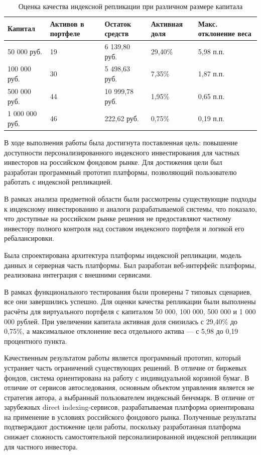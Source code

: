 \documentclass[14pt]{gost-7-32}
\begin{document}
\begin{table}[h]
\small
\setlength{\tabcolsep}{4pt}
\begin{tabularx}{\textwidth}{|p{}|p{}|p{}|p{}|X|}
\hline
\textbf{Капитал} &
\textbf{Активов в портфеле} &
\textbf{Остаток средств} &
\textbf{Активная доля} &
\textbf{Макс. отклонение веса} \\
\hline
50 000 руб. & 19 & 6 139,80 руб. & 29,40\% & 5,98 п.п. \\
\hline
100 000 руб. & 30 & 5 498,63 руб. & 7,35\% & 1,87 п.п. \\
\hline
500 000 руб. & 44 & 10 999,78 руб. & 1,95\% & 0,65 п.п. \\
\hline
1 000 000 руб. & 46 & 222,62 руб. & 0,75\% & 0,19 п.п. \\
\hline
\end{tabularx}
\caption{Оценка качества индексной репликации при различном размере капитала}
\label{tab:index-replication-quality}
\end{table}


\newpage

\conclusion

В ходе выполнения работы была достигнута поставленная цель: повышение доступности персонализированного индексного инвестирования для частных инвесторов на российском фондовом рынке. Для достижения цели был разработан программный прототип платформы, позволяющий пользователю работать с индексной репликацией.

В рамках анализа предметной области были рассмотрены существующие подходы к индексному инвестированию и аналоги разрабатываемой системы, что показало, что доступные на российском рынке решения не предоставляют частному инвестору полного контроля над составом индексного портфеля и логикой его ребалансировки.

Была спроектирована архитектура платформы индексной репликации, модель данных и серверная часть платформы. Был разработан веб-интерфейс платформы, реализована интеграция с внешними сервисами.

В рамках функционального тестирования были проверены 7 типовых сценариев, все они завершились успешно. Для оценки качества репликации были выполнены расчёты для виртуального портфеля с капиталом 50 000, 100 000, 500 000 и 1 000 000 рублей. При увеличении капитала активная доля снизилась с 29,40\% до 0,75\%, а максимальное отклонение веса отдельного актива --- с 5,98 до 0,19 процентного пункта.

Качественным результатом работы является программный прототип, который устраняет часть ограничений существующих решений. В отличие от биржевых фондов, система ориентирована на работу с индивидуальной корзиной бумаг. В отличие от сервисов автоследования, основным объектом управления является не стратегия автора, а выбранный пользователем индексный бенчмарк. В отличие от зарубежных direct indexing-сервисов, разрабатываемая платформа ориентирована на применение в условиях российского фондового рынка. Полученные результаты подтверждают достижение цели работы, поскольку разработанная платформа снижает сложность самостоятельной персонализированной индексной репликации для частного инвестора.
\end{document}
